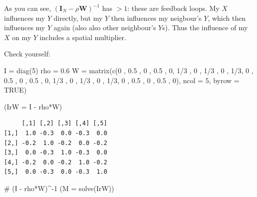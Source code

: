 \documentclass[
  letterpaper,
]{scrbook}
\newenvironment{Shaded}{\begin{snugshade}}{\end{snugshade}}
\newcommand{\AttributeTok}[1]{\textcolor[rgb]{0.40,0.45,0.13}{#1}}
\newcommand{\CommentTok}[1]{\textcolor[rgb]{0.37,0.37,0.37}{#1}}
\newcommand{\ConstantTok}[1]{\textcolor[rgb]{0.56,0.35,0.01}{#1}}
\newcommand{\DecValTok}[1]{\textcolor[rgb]{0.68,0.00,0.00}{#1}}
\newcommand{\FloatTok}[1]{\textcolor[rgb]{0.68,0.00,0.00}{#1}}
\newcommand{\FunctionTok}[1]{\textcolor[rgb]{0.28,0.35,0.67}{#1}}
\newcommand{\NormalTok}[1]{\textcolor[rgb]{0.00,0.23,0.31}{#1}}
\newcommand{\OtherTok}[1]{\textcolor[rgb]{0.00,0.23,0.31}{#1}}
\newcommand{\SpecialCharTok}[1]{\textcolor[rgb]{0.37,0.37,0.37}{#1}}
\begin{document}
As you can see,
\((\boldsymbol{\mathbf{I}}_N - \rho \boldsymbol{\mathbf{W}})^{-1}\) has
\color{red}{diagonal elements} \(>1\): these are feedback loops. My
\(X\) influences my \(Y\) directly, but my \(Y\) then influences my
neigbour's \(Y\), which then influences my \(Y\) again (also also other
neighbour's \(Y\)s). Thus the influence of my \(X\) on my \(Y\) includes
a spatial multiplier.

Check yourself:

\begin{Shaded}
\begin{Highlighting}[]
\NormalTok{I }\OtherTok{=} \FunctionTok{diag}\NormalTok{(}\DecValTok{5}\NormalTok{)}
\NormalTok{rho }\OtherTok{=} \FloatTok{0.6}
\NormalTok{W }\OtherTok{=} \FunctionTok{matrix}\NormalTok{(}\FunctionTok{c}\NormalTok{(}\DecValTok{0}\NormalTok{ , }\FloatTok{0.5}\NormalTok{ , }\DecValTok{0}\NormalTok{ , }\FloatTok{0.5}\NormalTok{ , }\DecValTok{0}\NormalTok{,}
            \DecValTok{1}\SpecialCharTok{/}\DecValTok{3}\NormalTok{ , }\DecValTok{0}\NormalTok{ , }\DecValTok{1}\SpecialCharTok{/}\DecValTok{3}\NormalTok{ , }\DecValTok{0}\NormalTok{ , }\DecValTok{1}\SpecialCharTok{/}\DecValTok{3}\NormalTok{,}
            \DecValTok{0}\NormalTok{ , }\FloatTok{0.5}\NormalTok{ , }\DecValTok{0}\NormalTok{ , }\FloatTok{0.5}\NormalTok{ , }\DecValTok{0}\NormalTok{,}
            \DecValTok{1}\SpecialCharTok{/}\DecValTok{3}\NormalTok{ , }\DecValTok{0}\NormalTok{ , }\DecValTok{1}\SpecialCharTok{/}\DecValTok{3}\NormalTok{ , }\DecValTok{0}\NormalTok{ , }\DecValTok{1}\SpecialCharTok{/}\DecValTok{3}\NormalTok{,}
            \DecValTok{0}\NormalTok{ , }\FloatTok{0.5}\NormalTok{ , }\DecValTok{0}\NormalTok{ , }\FloatTok{0.5}\NormalTok{ , }\DecValTok{0}\NormalTok{), }\AttributeTok{ncol =} \DecValTok{5}\NormalTok{, }\AttributeTok{byrow =} \ConstantTok{TRUE}\NormalTok{)}

\NormalTok{(}\AttributeTok{IrW =}\NormalTok{ I }\SpecialCharTok{{-}}\NormalTok{ rho}\SpecialCharTok{*}\NormalTok{W)}
\end{Highlighting}
\end{Shaded}

\begin{verbatim}
     [,1] [,2] [,3] [,4] [,5]
[1,]  1.0 -0.3  0.0 -0.3  0.0
[2,] -0.2  1.0 -0.2  0.0 -0.2
[3,]  0.0 -0.3  1.0 -0.3  0.0
[4,] -0.2  0.0 -0.2  1.0 -0.2
[5,]  0.0 -0.3  0.0 -0.3  1.0
\end{verbatim}

\begin{Shaded}
\begin{Highlighting}[]
\CommentTok{\# (I {-} rho*W)\^{}{-}1}
\NormalTok{(}\AttributeTok{M =} \FunctionTok{solve}\NormalTok{(IrW))}
\end{Highlighting}
\end{Shaded}
\end{document}
